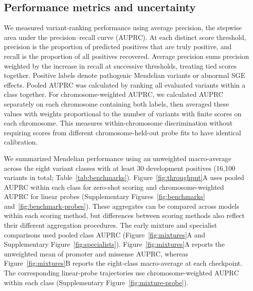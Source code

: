 \documentclass[a4paper,num-refs]{oup-contemporary}
\begin{document}
\subsection{Performance metrics and uncertainty}
\label{methods:statistics}

We measured variant-ranking performance using average precision, the
stepwise area under the precision--recall curve (AUPRC). At each distinct
score threshold, precision is the proportion of predicted positives
that are truly positive, and recall is the proportion of all positives
recovered. Average precision sums precision weighted by the increase
in recall at successive thresholds, treating tied scores together.
Positive labels denote pathogenic Mendelian variants or abnormal SGE
effects. Pooled AUPRC was calculated by ranking all evaluated variants
within a class together. For chromosome-weighted AUPRC, we calculated
AUPRC separately on each chromosome containing both labels, then
averaged these values with weights proportional to the number of
variants with finite scores on each chromosome. This measures
within-chromosome discrimination without requiring scores from
different chromosome-held-out probe fits to have identical calibration.

We summarized Mendelian performance using an unweighted macro-average
across the eight variant classes with at least 30 development positives
(16,100 variants in total; Table~\ref{tab:benchmarks}).
Figure~\ref{fig:throughput}A uses pooled AUPRC within each class for
zero-shot scoring and chromosome-weighted AUPRC for linear probes
(Supplementary Figures~\ref{fig:benchmarks}
and~\ref{fig:benchmark-probes}).
These aggregates can be compared across models within each scoring
method, but differences between scoring methods also reflect their
different aggregation procedures.
The early mixture and specialist comparisons used pooled class AUPRC
(Figure~\ref{fig:mixtures}A and Supplementary
Figure~\ref{fig:specialists}).
Figure~\ref{fig:mixtures}A reports the unweighted mean of promoter
and missense AUPRC, whereas Figure~\ref{fig:mixtures}B reports the
eight-class macro-average at each checkpoint.
The corresponding linear-probe trajectories use chromosome-weighted
AUPRC within each class (Supplementary
Figure~\ref{fig:mixture-probe}).
\end{document}
